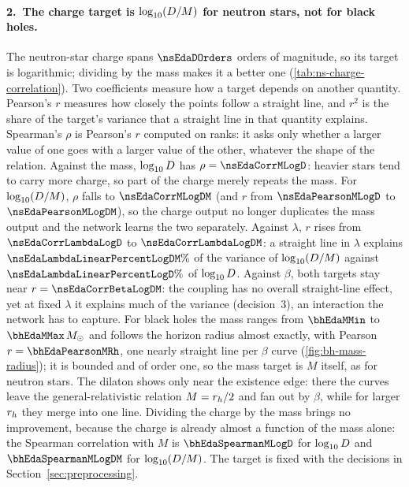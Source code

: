 \paragraph{2.\ The charge target is $\log_{10}(D/M)$ for neutron stars, not for black holes.}
The neutron-star charge spans $\nsEdaDOrders$ orders of magnitude, so its target is logarithmic; dividing by the mass makes it a better one (\cref{tab:ns-charge-correlation}). Two coefficients measure how a target depends on another quantity. Pearson's $r$ measures how closely the points follow a straight line, and $r^2$ is the share of the target's variance that a straight line in that quantity explains. Spearman's $\rho$ is Pearson's $r$ computed on ranks: it asks only whether a larger value of one goes with a larger value of the other, whatever the shape of the relation.
Against the mass, $\log_{10}D$ has $\rho = \nsEdaCorrMLogD$: heavier stars tend to carry more charge, so part of the charge merely repeats the mass. For $\log_{10}(D/M)$, $\rho$ falls to $\nsEdaCorrMLogDM$ (and $r$ from $\nsEdaPearsonMLogD$ to $\nsEdaPearsonMLogDM$), so the charge output no longer duplicates the mass output and the network learns the two separately.
Against $\lambda$, $r$ rises from $\nsEdaCorrLambdaLogD$ to $\nsEdaCorrLambdaLogDM$: a straight line in $\lambda$ explains $\nsEdaLambdaLinearPercentLogDM\%$ of the variance of $\log_{10}(D/M)$ against $\nsEdaLambdaLinearPercentLogD\%$ of $\log_{10}D$. Against $\beta$, both targets stay near $r = \nsEdaCorrBetaLogDM$: the coupling has no overall straight-line effect, yet at fixed $\lambda$ it explains much of the variance (decision~3), an interaction the network has to capture.
For black holes the mass ranges from $\bhEdaMMin$ to $\bhEdaMMax\,\Msun$ and follows the horizon radius almost exactly, with Pearson $r = \bhEdaPearsonMRh$, one nearly straight line per $\beta$ curve (\cref{fig:bh-mass-radius}); it is bounded and of order one, so the mass target is $M$ itself, as for neutron stars. The dilaton shows only near the existence edge: there the curves leave the general-relativistic relation $M = r_h/2$ and fan out by $\beta$, while for larger $r_h$ they merge into one line. Dividing the charge by the mass brings no improvement, because the charge is already almost a function of the mass alone: the Spearman correlation with $M$ is $\bhEdaSpearmanMLogD$ for $\log_{10}D$ and $\bhEdaSpearmanMLogDM$ for $\log_{10}(D/M)$. The target is fixed with the decisions in Section~\ref{sec:preprocessing}.

